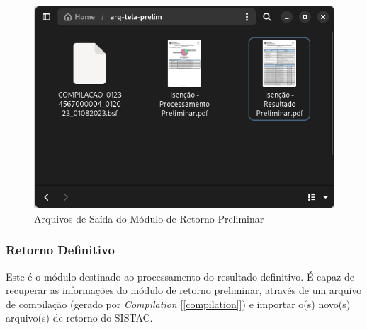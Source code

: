 \documentclass[
	12pt,			%
	openright,		%
	oneside,	
	a4paper,		%
	english,		%
	brazil			%
]{abntex2/abntex2}  %
\begin{document}
					\begin{figure}[H]
						\begin{center}
							
							\caption{Arquivos de Saída do Módulo de Retorno Preliminar}
							\label{retorno-prelim-files}
							
							\includegraphics[scale=0.45]{img/retorno-prelim-files}
							
						\end{center}
					\end{figure}
		
				\subsubsection{Retorno Definitivo}
	
					Este é o módulo destinado ao processamento do resultado definitivo. É capaz de recuperar as informações do módulo de retorno preliminar, através de um arquivo de compilação (gerado por \textit{Compilation} [\ref{compilation}]) e importar o(s) novo(s) arquivo(s) de retorno do SISTAC.
\end{document}
